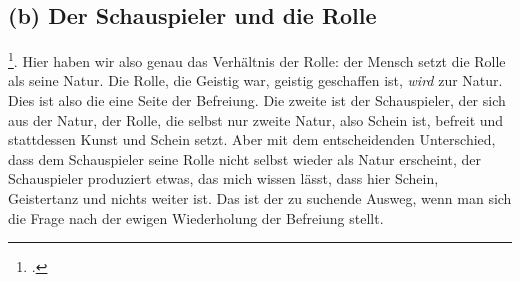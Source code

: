 \documentclass[12pt, a4paper, openany]{report}
\begin{document}
\subsection{(b) Der Schauspieler und die Rolle}
\footcite[][393]{khurana_freiheit_2017}. 
Hier haben wir also genau das Verhältnis der Rolle: der Mensch setzt die Rolle als seine Natur. 
Die Rolle, die Geistig war, geistig geschaffen ist, \emph{wird} zur Natur. 
Dies ist also die eine Seite der Befreiung. 
Die zweite ist der Schauspieler, der sich aus der Natur, der Rolle, die selbst nur zweite Natur, also Schein ist, befreit und stattdessen Kunst und Schein setzt. 
Aber mit dem entscheidenden Unterschied, dass dem Schauspieler seine Rolle nicht selbst wieder als Natur erscheint, der Schauspieler produziert etwas, das mich wissen lässt, dass hier Schein, Geistertanz und nichts weiter ist. 
Das ist der zu suchende Ausweg, wenn man sich die Frage nach der ewigen Wiederholung der Befreiung stellt.
\end{document}
